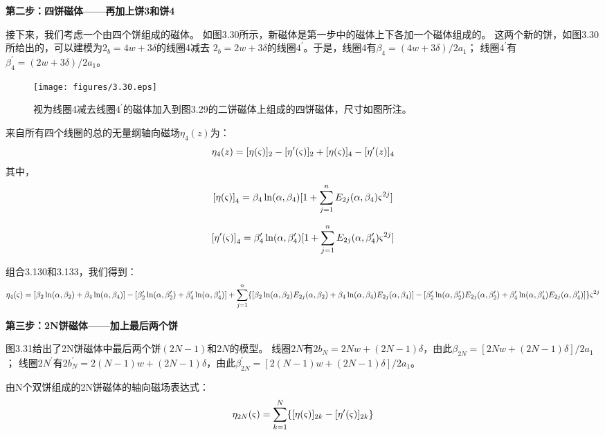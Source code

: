 \textbf{第二步：四饼磁体——再加上饼3和饼4}

接下来，我们考虑一个由四个饼组成的磁体。
如图3.30所示，新磁体是第一步中的磁体上下各加一个磁体组成的。
这两个新的饼，如图3.30所给出的，可以建模为$2_b=4w+3\delta$的线圈4减去
$2_b=2w+3\delta$的线圈$4^\prime$。于是，线圈4有$\beta_4=(4w+3\delta)/2a_1$；
线圈$4^\prime$有$\beta_4^\prime=(2w+3\delta)/2a_1$。
\begin{figure}[htbp]
	\centering
	\texttt{[image: figures/3.30.eps]}
	\caption{视为线圈4减去线圈$4^\prime$的磁体加入到图3.29的二饼磁体上组成的四饼磁体，尺寸如图所注。}
\end{figure}

来自所有四个线圈的总的无量纲轴向磁场$\eta_4(z)$为：
$$
\eta_{4}(z)=[\eta(\varsigma)]_{2}-[\eta'(\varsigma)]_{2}+[\eta(\varsigma)]_{4}-[\eta'(z)]_{4}\\%
$$
其中，
$$
{[\eta(\varsigma)]}_{4}=\beta_{4}\ln(\alpha,\beta_{4})[1+\sum_{j=1}^{n}E_{2j}(\alpha,\beta_{4})\varsigma^{2j}]\\%
$$

$$
{[\eta'(\varsigma)]}_{4}=\beta'_{4}\ln(\alpha,\beta'_{4})[1+\sum_{j=1}^{n}E_{2j}(\alpha,\beta'_{4})\varsigma^{2j}]\\%
$$

组合3.130和3.133，我们得到：
$$
\eta_{4}(\varsigma)=[\beta_{2}\ln(\alpha,\beta_{2})+\beta_{4}\ln(\alpha,\beta_{4})]-[\beta'_{2}\ln(\alpha,\beta'_{2})+\beta'_{4}\ln(\alpha,\beta'_{4})]\\
+\sum_{j=1}^{n}\{[\beta_{2}\ln(\alpha,\beta_{2})E_{2j}(\alpha,\beta_{2})+\beta_{4}\ln(\alpha,\beta_{4})E_{2j}(\alpha,\beta_{4})]\\
-[\beta'_{2}\ln(\alpha,\beta'_{2})E_{2j}(\alpha,\beta'_{2})+\beta'_{4}\ln(\alpha,\beta'_{4})E_{2j}(\alpha,\beta'_{4})]\}\varsigma^{2j}\\%
$$

\textbf{第三步：2N饼磁体——加上最后两个饼}

图3.31给出了2N饼磁体中最后两个饼$(2N−1)$和$2N$的模型。
线圈$2N$有$2b_N =2Nw+(2N−1)\delta$，由此$\beta_{2N}=[2Nw+(2N−1)\delta]/2a_1$；
线圈$2N^\prime$有$2b_N^\prime=2(N-1)w+(2N−1)\delta$，由此$\beta_{2N}^\prime=[2(N-1)w+(2N−1)\delta]/2a_1$。

由N个双饼组成的2N饼磁体的轴向磁场表达式：
\begin{equation}
\eta_{2N}(\varsigma)=\sum_{k=1}^{N}\{[\eta(\varsigma)]_{2k}-[\eta'(\varsigma)]_{2k}\}\\%
\end{equation}

